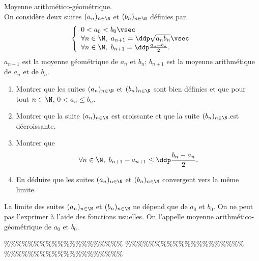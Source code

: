 



\begin{exercice} Moyenne arithm\'etico-g\'eom\'etrique.\\
\noindent On consid\`ere deux suites $(a_n)_{n\in\N}$ et $(b_n)_{n\in\N}$ d\'efinies par 
$$\left\lbrace\begin{array}{l}
0<a_0<b_0\vsec\\
\forall n\in\N,\ a_{n+1}=\ddp\sqrt{a_nb_n}\vsec\\
\forall n\in\N,\ b_{n+1}=\ddp\frac{a_n+b_n}{2}.
\end{array}\right.$$
$a_{n+1}$ est la moyenne g\'eom\'etrique de $a_n$ et $b_n$; $b_{n+1}$ est la moyenne arithm\'etique de $a_n$ et de $b_n$.
\begin{enumerate}
 \item 
Montrer que les suites $(a_n)_{n\in\N}$ et $(b_n)_{n\in\N}$ sont bien d\'efinies et que pour tout $n\in\N$, $0<a_n\leq b_n$.
\item 
Montrer que la suite $(a_n)_{n\in\N}$ est croissante et que la suite $(b_n)_{n\in\N}$.est d\'ecroissante.
\item 
Montrer que
$$\forall n\in\N,\ b_{n+1}-a_{n+1}\leq \ddp\frac{b_n-a_n}{2}.$$
\item 
En d\'eduire que les suites $(a_n)_{n\in\N}$ et $(b_n)_{n\in\N}$ convergent vers la m\^eme limite.
\end{enumerate}
La limite des suites $(a_n)_{n\in\N}$ et $(b_n)_{n\in\N}$ ne d\'epend que de $a_0$ et $b_0$. On ne peut pas l'exprimer \`a l'aide des fonctions usuelles. On l'appelle moyenne arithm\'etico-g\'eom\'etrique de $a_0$ et $b_0$.
\end{exercice}



\%\%\%\%\%\%\%\%\%\%\%\%\%\%\%\%\%\%\%\%
\%\%\%\%\%\%\%\%\%\%\%\%\%\%\%\%\%\%\%\%
\%\%\%\%\%\%\%\%\%\%\%\%\%\%\%\%\%\%\%\%



